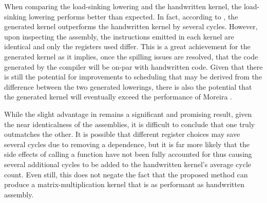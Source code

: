 \documentclass[\main/thesis.tex]{subfiles}
\begin{document}
When comparing the load-sinking lowering and the handwritten kernel, the load-sinking lowering performs better than expected.
In fact, according to , the generated kernel outperforms the handwritten kernel by several cycles.
However, upon inspecting the assembly, the instructions emitted in each kernel are identical and only the registers used differ.
This is a great achievement for the generated kernel as it implies, once the spilling issues are resolved, that the code generated by the compiler will be on-par with handwritten code.
Given that there is still the potential for improvements to scheduling that may be derived from the difference between the two generated lowerings, there is also the potential that the generated kernel will eventually exceed the performance of Moreira \etal.

While the slight advantage in  remains a significant and promising result, given the near identicalness of the assemblies, it is difficult to conclude that one truly outmatches the other.
It is possible that different register choices may save several cycles due to removing a dependence, but it is far more likely that the side effects of calling a function have not been fully accounted for thus causing several additional cycles to be added to the handwritten kernel's average cycle count.
Even still, this does not negate the fact that the proposed method can produce a matrix-multiplication kernel that is as performant as handwritten assembly.
\end{document}
